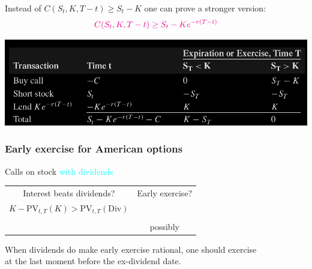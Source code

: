 \begin{frame}[fragile,t]
\begin{center}
	Instead of $C(S_t,K,T-t) \ge S_t - K$ one can prove a stronger version:
	\bigskip
	\begin{equation*}
		\textcolor{magenta}{C(S_t,K,T-t) \ge S_t - Ke^{-r(T-t)}}
	\end{equation*}

	\bigskip
	\mySeparateLine
	\bigskip

	\includegraphics[scale=0.25]{figs/Table-9-4.png}

\end{center}
\end{frame}
\begin{frame}[fragile,t]
	\frametitle{Early exercise for American options}
	\begin{center}
		Calls on stock \textcolor{cyan}{with dividends}
		\vfill

		\renewcommand{\arraystretch}{1.2}
		\begin{tabular}{|c|c|}
			\hline
			Interest beats dividends?                            & Early exercise? \\
			$K-\text{PV}_{t,T}(K) > \text{PV}_{t,T}(\text{Div})$ &                 \\ \hline
			\cmark                                               & \xmark          \\
			\xmark                                               & possibly        \\ \hline
		\end{tabular}

		\vfill

		When dividends do make early exercise rational, one should exercise \\
		at the last moment before the ex-dividend date.

	\end{center}
\end{frame}
